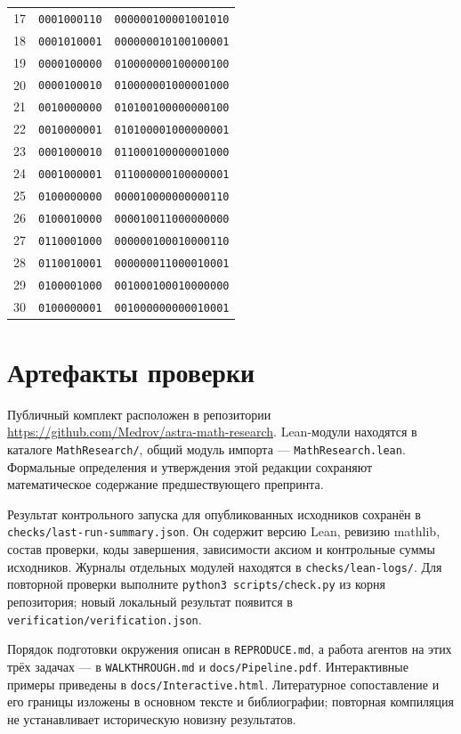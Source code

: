 \documentclass[11pt,a4paper]{article}
\numberwithin{equation}{section}
\theoremstyle{definition}
\theoremstyle{remark}
\begin{document}
\begin{longtable}{@{}rll@{}}
17 & \texttt{0001000110} & \texttt{000000100001001010} \\
18 & \texttt{0001010001} & \texttt{000000010100100001} \\
19 & \texttt{0000100000} & \texttt{010000000100000100} \\
20 & \texttt{0000100010} & \texttt{010000001000001000} \\
21 & \texttt{0010000000} & \texttt{010100100000000100} \\
22 & \texttt{0010000001} & \texttt{010100001000000001} \\
23 & \texttt{0001000010} & \texttt{011000100000001000} \\
24 & \texttt{0001000001} & \texttt{011000000100000001} \\
25 & \texttt{0100000000} & \texttt{000010000000000110} \\
26 & \texttt{0100010000} & \texttt{000010011000000000} \\
27 & \texttt{0110001000} & \texttt{000000100010000110} \\
28 & \texttt{0110010001} & \texttt{000000011000010001} \\
29 & \texttt{0100001000} & \texttt{001000100010000000} \\
30 & \texttt{0100000001} & \texttt{001000000000010001} \\
\end{longtable}
\endgroup

\section{Артефакты проверки}
Публичный комплект расположен в репозитории
\url{https://github.com/Medrov/astra-math-research}.
Lean-модули находятся в каталоге \nolinkurl{MathResearch/},
общий модуль импорта --- \nolinkurl{MathResearch.lean}.
Формальные определения и утверждения этой редакции сохраняют
математическое содержание предшествующего препринта.

Результат контрольного запуска для опубликованных исходников
сохранён в \nolinkurl{checks/last-run-summary.json}.
Он содержит версию Lean, ревизию mathlib, состав проверки,
коды завершения, зависимости аксиом и контрольные суммы исходников.
Журналы отдельных модулей находятся в
\nolinkurl{checks/lean-logs/}. Для повторной проверки выполните
\mbox{\texttt{python3\ scripts/check.py}} из корня репозитория;
новый локальный результат появится в
\nolinkurl{verification/verification.json}.

Порядок подготовки окружения описан в \nolinkurl{REPRODUCE.md},
а работа агентов на этих трёх задачах --- в
\nolinkurl{WALKTHROUGH.md} и \nolinkurl{docs/Pipeline.pdf}.
Интерактивные примеры приведены в \nolinkurl{docs/Interactive.html}.
Литературное сопоставление и его границы изложены в основном тексте
и библиографии; повторная компиляция не устанавливает историческую
новизну результатов.
\end{document}
